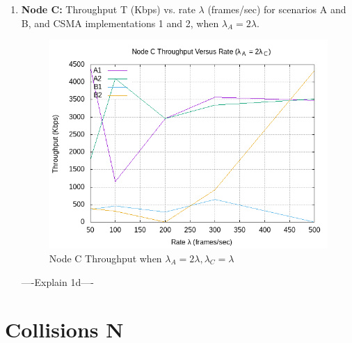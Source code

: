 \documentclass[12pt]{article}
\begin{document}
\begin{enumerate}
{            ----Explain 1c----
        }
        
\clearpage
        \item {
            {\bf Node C:} Throughput T (Kbps) vs. rate \(\lambda{}\) (frames/sec) for scenarios A and B, and CSMA implementations 1 and 2, when \(\lambda{}_A = 2\lambda{}\).
            
            \begin{figure}[!htb]
                \centering
                \includegraphics[width=5in]{1D.png}
                \caption{Node C Throughput when \(\lambda{}_A = 2\lambda{}, \lambda{}_C = \lambda{}\) }
                \label{fig:1D}
            \end{figure}

            ----Explain 1d----
        }
        
    \end{enumerate}
        
\clearpage        
\section{Collisions N}
\end{document}
